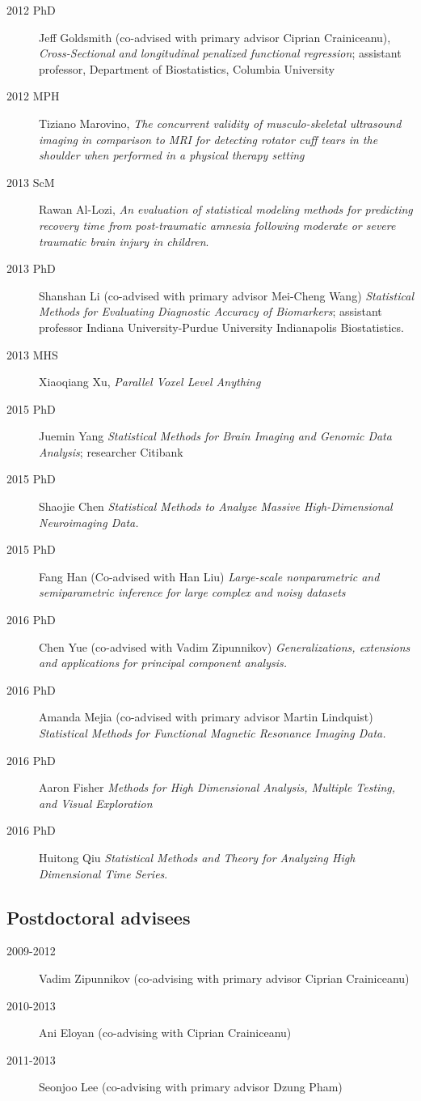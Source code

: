 \documentclass[12pt]{article}
\begin{document}
\begin{description}
\item[\textnormal{2012 PhD}] Jeff Goldsmith (co-advised with primary advisor Ciprian Crainiceanu), {\it Cross-Sectional and longitudinal penalized functional regression}; assistant professor, Department of Biostatistics, Columbia University
\item[\textnormal{2012 MPH}] Tiziano Marovino, {\it The concurrent validity of musculo-skeletal ultrasound imaging in comparison to
MRI for detecting rotator cuff tears in the shoulder when performed in a physical therapy setting}
\item[\textnormal{2013 ScM}] Rawan Al-Lozi, {\it An evaluation of statistical modeling
methods for predicting recovery time from post-traumatic amnesia following moderate or severe traumatic brain injury in children}.
\item[\textnormal{2013 PhD}] Shanshan Li (co-advised with primary advisor Mei-Cheng Wang)
 {\it Statistical Methods for Evaluating Diagnostic Accuracy of Biomarkers}; assistant professor Indiana University-Purdue University  Indianapolis Biostatistics.
\item[\textnormal{2013 MHS}] Xiaoqiang Xu, {\it Parallel Voxel Level Anything}
\item[\textnormal{2015 PhD}] Juemin Yang {\it Statistical Methods for Brain
Imaging and Genomic Data Analysis}; researcher Citibank
\item[\textnormal{2015 PhD}] Shaojie Chen {\it Statistical Methods to Analyze Massive High-Dimensional Neuroimaging Data.}
\item[\textnormal{2015 PhD}] Fang Han (Co-advised with Han Liu) {\it Large-scale nonparametric and semiparametric inference for large complex and noisy datasets}
\item[\textnormal{2016 PhD}] Chen Yue (co-advised with Vadim Zipunnikov) {\it Generalizations, extensions and applications for principal component analysis.}
\item[\textnormal{2016 PhD}] Amanda Mejia (co-advised with primary advisor Martin Lindquist) {\it Statistical Methods for Functional Magnetic Resonance Imaging Data. }
\item[\textnormal{2016 PhD}] Aaron Fisher {\it Methods for High Dimensional Analysis, Multiple Testing, and Visual Exploration }
\item[\textnormal{2016 PhD}] Huitong Qiu {\it Statistical Methods and Theory for  Analyzing High Dimensional Time Series}.
\end{description}

\subsection*{Postdoctoral advisees}
\begin{description}
\item[\textnormal{2009-2012}] Vadim Zipunnikov (co-advising with primary advisor Ciprian Crainiceanu)
\item[\textnormal{2010-2013}] Ani Eloyan (co-advising with Ciprian Crainiceanu)
\item[\textnormal{2011-2013}] Seonjoo Lee (co-advising with primary advisor Dzung Pham)
\end{description}
\end{document}

